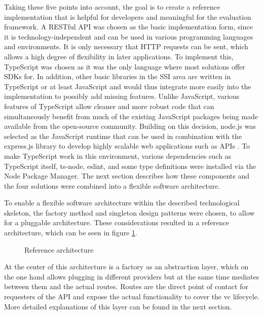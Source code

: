     Taking these five points into account, the goal is to create a reference implementation that is helpful for developers and meaningful for the evaluation framework. A RESTful API was chosen as the basic implementation form, since it is technology-independent and can be used in various programming languages and environments. It is only necessary that HTTP requests can be sent, which allows a high degree of flexibility in later applications. To implement this, TypeScript was chosen as it was the only language where most solutions offer SDKs for. In addition, other basic libraries in the \ac{SSI} area are written in TypeScript or at least JavaScript and would thus integrate more easily into the implementation to possibly add missing features. Unlike JavaScript, various features of TypeScript allow cleaner and more robust code \cite[p. 87]{zammetti_modern_2020} that can simultaneously benefit from much of the existing JavaScript packages being made available from the open-source community. Building on this decision, node.js was selected as the JavaScript runtime that can be used in combination with the express.js library to develop highly scalable web applications such as APIs \cite{openjs_foundation_about_2021, openjs_foundation_express_2021}. To make TypeScript work in this environment, various dependencies such as TypeScript itself, ts-node, eslint, and some type definitions were installed via the Node Package Manager. The next section describes how these components and the four solutions were combined into a flexible software architecture.
    
    To enable a flexible software architecture within the described technological skeleton, the factory method and singleton design patterns were chosen, to allow for a pluggable architecture. These considerations resulted in a reference architecture, which can be seen in figure \ref{figure: ref arch}.
    
    \begin{figure}[ht]
	    \centering    	    
	    \makebox[\textwidth]{}
        \caption{Reference architecture}
        \label{figure: ref arch}
    \end{figure}
    
    At the center of this architecture is a factory as an abstraction layer, which on the one hand allows plugging in different providers but at the same time mediates between them and the actual routes. Routes are the direct point of contact for requesters of the API and expose the actual functionality to cover the \ac{vc} lifecycle. More detailed explanations of this layer can be found in the next section.

